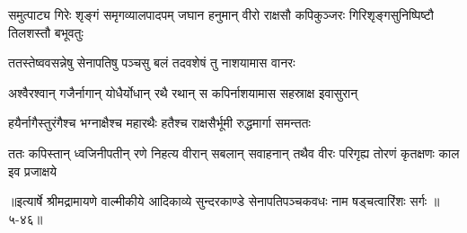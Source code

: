 \threelineshloka
{समुत्पाट्य गिरेः शृङ्गं समृगव्यालपादपम्}
{जघान हनुमान् वीरो राक्षसौ कपिकुञ्जरः}
{गिरिशृङ्गसुनिष्पिष्टौ तिलशस्तौ बभूवतुः} %

\twolineshloka
{ततस्तेष्ववसन्नेषु सेनापतिषु पञ्चसु}
{बलं तदवशेषं तु नाशयामास वानरः} %

\twolineshloka
{अश्वैरश्वान् गजैर्नागान् योधैर्योधान् रथै रथान्}
{स कपिर्नाशयामास सहस्राक्ष इवासुरान्} %

\twolineshloka
{हयैर्नागैस्तुरंगैश्च भग्नाक्षैश्च महारथैः}
{हतैश्च राक्षसैर्भूमी रुद्धमार्गा समन्ततः} %

\twolineshloka
{ततः कपिस्तान् ध्वजिनीपतीन् रणे निहत्य वीरान् सबलान् सवाहनान्}
{तथैव वीरः परिगृह्य तोरणं कृतक्षणः काल इव प्रजाक्षये} %


॥इत्यार्षे श्रीमद्रामायणे वाल्मीकीये आदिकाव्ये सुन्दरकाण्डे सेनापतिपञ्चकवधः नाम षड्चत्वारिंशः सर्गः ॥५-४६॥
